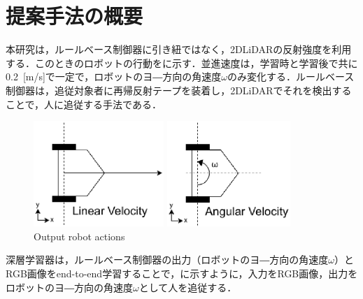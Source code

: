 
\section{提案手法の概要}

  本研究は，ルールベース制御器に引き紐ではなく，2DLiDARの反射強度を利用する．このときのロボットの行動をに示す．並進速度は，学習時と学習後で共に0.2 \,[m/s]で一定で，ロボットのヨ―方向の角速度$\omega$のみ変化する．ルールベース制御器は，追従対象者に再帰反射テープを装着し，2DLiDARでそれを検出することで，人に追従する手法である．

  \begin{figure}[h]
    \centering
    \begin{minipage}[c]{65mm} 
        \centering
        \includegraphics[height=40mm]{images/eps/RobotGuidance_linear_velocity}
    \end{minipage}
    \begin{minipage}[c]{65mm} 
        \centering
        \includegraphics[height=40mm]{images/eps/RobotGuidance_angular_velocity}
    \end{minipage}
    \caption{Output robot actions}
    \label{Fig:RobotGuidance_velocity}
  \end{figure}

\newpage

  深層学習器は，ルールベース制御器の出力（ロボットのヨ―方向の角速度$\omega$）とRGB画像をend-to-end学習することで，に示すように，入力をRGB画像，出力をロボットのヨ―方向の角速度$\omega$として人を追従する．

